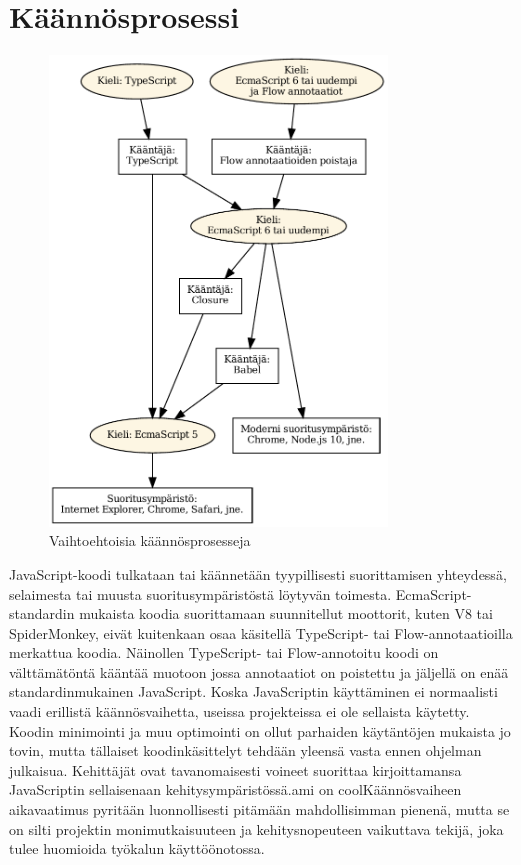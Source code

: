 \section{Käännösprosessi}
\begin{figure}[!htb]
\centering
\includegraphics[width=0.8\textwidth]{images/compilation.pdf}
\caption{Vaihtoehtoisia käännösprosesseja}
\label{fig:compilation}
\end{figure}
JavaScript-koodi tulkataan tai käännetään tyypillisesti suorittamisen
yhteydessä, selaimesta tai muusta suoritusympäristöstä löytyvän 
toimesta. EcmaScript-stan\-dar\-din mukaista koodia suorittamaan suunnitellut
moottorit, kuten V8 tai SpiderMonkey, eivät kuitenkaan osaa käsitellä
TypeScript- tai Flow-annotaatioilla merkattua koodia. Näinollen TypeScript-
tai Flow-annotoitu koodi on välttämätöntä kääntää muotoon jossa
annotaatiot on poistettu ja jäljellä on enää standardinmukainen JavaScript.
Koska JavaScriptin käyttäminen ei normaalisti vaadi erillistä
käännösvaihetta, useissa projekteissa ei ole sellaista käytetty. Koodin
minimointi ja muu optimointi on ollut parhaiden käytäntöjen mukaista jo
tovin, mutta tällaiset koodinkäsittelyt tehdään yleensä vasta ennen ohjelman
julkaisua. Kehittäjät ovat tavanomaisesti voineet suorittaa kirjoittamansa
JavaScriptin sellaisenaan kehitysympäristössä.ami on coolKäännösvaiheen aikavaatimus
pyritään luonnollisesti pitämään mahdollisimman pienenä, mutta se on silti
projektin monimutkaisuuteen ja kehitysnopeuteen vaikuttava tekijä, joka
tulee huomioida työkalun käyttöönotossa.

